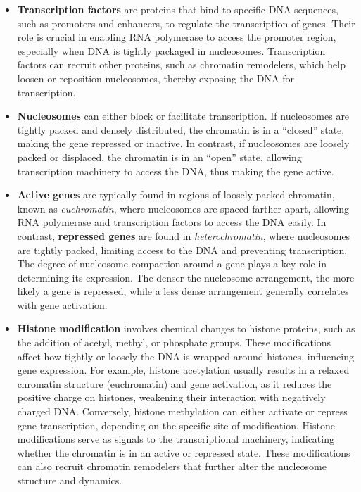 \documentclass[a4paper]{article}
\begin{document}
\begin{itemize}
  \item \textbf{Transcription factors} are proteins that bind to specific DNA 
  sequences, such as promoters and enhancers, to regulate the transcription 
  of genes. Their role is crucial in enabling RNA polymerase to access the 
  promoter region, especially when DNA is tightly packaged in nucleosomes. 
  Transcription factors can recruit other proteins, such as chromatin 
  remodelers, which help loosen or reposition nucleosomes, thereby exposing 
  the DNA for transcription.
  
  \item \textbf{Nucleosomes} can either block or facilitate transcription. 
  If nucleosomes are tightly packed and densely distributed, the chromatin 
  is in a ``closed'' state, making the gene repressed or inactive. In contrast, 
  if nucleosomes are loosely packed or displaced, the chromatin is in an ``open'' 
  state, allowing transcription machinery to access the DNA, thus making the 
  gene active.

  \item \textbf{Active genes} are typically found in regions of loosely packed 
  chromatin, known as \textit{euchromatin}, where nucleosomes are spaced farther 
  apart, allowing RNA polymerase and transcription factors to access the DNA 
  easily. In contrast, \textbf{repressed genes} are found in 
  \textit{heterochromatin}, where nucleosomes are tightly packed, 
  limiting access to the DNA and preventing transcription.
  The degree of nucleosome compaction around a gene plays a key role in 
  determining its expression. The denser the nucleosome arrangement, the 
  more likely a gene is repressed, while a less dense arrangement generally 
  correlates with gene activation.

  \item \textbf{Histone modification} involves chemical changes to histone 
  proteins, such as the addition of acetyl, methyl, or phosphate groups. 
  These modifications affect how tightly or loosely the DNA is wrapped around 
  histones, influencing gene expression. For example, histone acetylation 
  usually results in a relaxed chromatin structure (euchromatin) and gene 
  activation, as it reduces the positive charge on histones, weakening their 
  interaction with negatively charged DNA. Conversely, histone methylation can 
  either activate or repress gene transcription, depending on the specific site 
  of modification.
  Histone modifications serve as signals to the transcriptional machinery, 
  indicating whether the chromatin is in an active or repressed state. 
  These modifications can also recruit chromatin remodelers that further 
  alter the nucleosome structure and dynamics.
\end{itemize}
  
\end{document}
